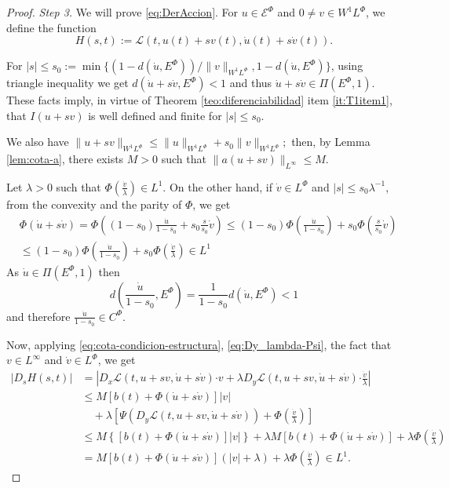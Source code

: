 \documentclass[twoside]{article}
\theoremstyle{remark}
\newcommand{\linf}{\|_{L^{\infty}}}
\newcommand{\lphi}{L^{\Phi}}
\newcommand{\ephi}{E^{\Phi}}
\newcommand{\wphi}{W^{1}\lphi}
\newcommand{\sobnor}{\|_{W^{1}\lphi}}
\newcommand{\domi}{\mathcal{E}^{\Phi}}
\renewcommand{\b}[1]{\boldsymbol{#1}}
\newcommand{\ccdot}{\b{\cdot}}
\renewcommand{\leq}{\leqslant}
\begin{document}
\begin{proof}
\emph{Step 3.} We will prove \eqref{eq:DerAccion}. 
For $u\in \domi$ and $0\neq v\in\wphi$, we define the function
\[H(s,t):=\mathcal{L}(t,u(t)+s v(t),\dot{u}(t)+s\dot{v}(t)).\]


For  $|s|\leq s_0:=\min\{\left(1-d(\dot{u},\ephi)\right)/\|v\sobnor, 1-d(\dot{u},\ephi)\}$, 
using triangle inequality we get 
$
d \left(\dot{u}+s \dot{v}, \ephi \right)<1$ and thus $\dot{u}+s\dot{v} \in \Pi(\ephi,1)$. 
These facts imply, in virtue of Theorem \ref{teo:diferenciabilidad} item \ref{it:T1item1}, 
that $I(u+s v)$ is well defined and finite for $|s|\leq s_0$. 

We also have 
$
\|u+sv\sobnor\leq \|u\sobnor+s_0\|v\sobnor;
$
then, by Lemma \ref{lem:cota-a}, there exists $M>0$ such that 
$\|a(u+sv)\linf\leq M$.

Let $\lambda>0$ such that $\Phi(\frac{\dot{v}}{\lambda})\in L^1$.
On the other hand, if $\dot{v}\in\lphi$ and $|s|\leq s_0 \lambda^{-1}$,
from the convexity and the parity of $\Phi$, we get
\[
\begin{split}
&\Phi(\dot{u}+s\dot{v})=
\Phi\left((1-s_0)\frac{\dot{u}}{1-s_0}+s_0 \frac{s}{s_0}\dot{v}\right)
\leq
(1-s_0)\Phi\left(\frac{\dot{u}}{1-s_0}\right)+s_0 \Phi\left(\frac{s}{s_0}\dot{v}\right)
\\
&\leq
(1-s_0)\Phi\left(\frac{\dot{u}}{1-s_0}\right)+s_0 \Phi\left(\frac{\dot{v}}{\lambda}\right)
\in L^1
\end{split}
\]
As $\dot{u}\in\Pi(\ephi,1)$ then
\[
d\left(\frac{\dot{u}}{1-s_0},E^{\Phi}\right)=\frac{1}{1-s_0}d(\dot{u}, E^{\Phi})<1
\]
and therefore $\frac{\dot{u}}{1-s_0}\in C^\Phi$.

Now, applying \eqref{eq:cota-condicion-estructura}, \eqref{eq:Dy_lambda-Psi},  
the fact that $v \in L^{\infty}$ and $\dot{v}\in\lphi$, 
we get
\begin{equation}\label{ctg}
\begin{split}
|D_s H(s,t)|&=\left| D_{x}\mathcal{L}(t,u+sv,\dot{u}+s\dot{v})\ccdot v +  
\lambda D_{y}\mathcal{L}(t, u+s v, \dot{u}+s\dot{v})\ccdot\frac{\dot{v}}{\lambda}\right| \\
  & \leq M \left[ b(t)+ \Phi(\dot{u}+s\dot{v})\right]|v|\\
 &\quad+ \lambda\left[\Psi(D_{y}\mathcal{L}(t,u+sv,\dot{u}+s\dot{v}))+\Phi\left(\frac{\dot{v}}{\lambda}\right) \right]
\\
 &\leq M \left\{\left[ b(t)+ \Phi(\dot{u}+s\dot{v})\right]|v|\right\}+
 \lambda M[ b(t)+ \Phi(\dot{u}+s\dot{v})]+\lambda \Phi\left(\frac{\dot{v}}{\lambda}\right)
 \\
 &=
 M [ b(t)+ \Phi(\dot{u}+s\dot{v})] (|v|+\lambda) +\lambda \Phi\left(\frac{\dot{v}}{\lambda}\right)
 \in L^1.
\end{split}
\end{equation}


\end{proof}
\end{document}
